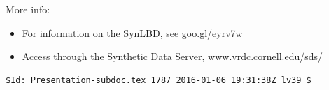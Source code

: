 \begin{frame}[fragile]
\begin{center}
More info: 
\begin{itemize}
\item For information on the SynLBD, see 
\href{http://www2.vrdc.cornell.edu/news/data/lbd-synthetic-data/}{goo.gl/eyrv7w}
\item Access through the Synthetic Data Server, 
\href{http://www.vrdc.cornell.edu/sds/}{www.vrdc.cornell.edu/sds/} 
\end{itemize}

\end{center}
\tiny\vspace{0.8\textheight}\vfill 
\begin{verbatim}
$Id: Presentation-subdoc.tex 1787 2016-01-06 19:31:38Z lv39 $
\end{verbatim}
\end{frame}

